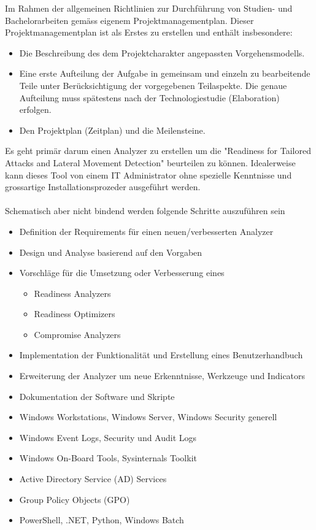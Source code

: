 Im Rahmen der allgemeinen Richtlinien zur Durchführung von Studien- und Bachelorarbeiten gemäss eigenem Projektmanagementplan. Dieser Projektmanagementplan ist als Erstes zu erstellen und enthält insbesondere:
\begin{itemize}
    \item Die Beschreibung des dem Projektcharakter angepassten Vorgehensmodells.
    \item Eine erste Aufteilung der Aufgabe in gemeinsam und einzeln zu bearbeitende Teile unter Berücksichtigung der vorgegebenen Teilaspekte. Die genaue Aufteilung muss spätestens nach der Technologiestudie (Elaboration) erfolgen.
    \item Den Projektplan (Zeitplan) und die Meilensteine.
\end{itemize}

Es geht primär darum einen Analyzer zu erstellen um die "Readiness for Tailored Attacks and Lateral Movement Detection" beurteilen zu können. Idealerweise kann dieses Tool von einem IT Administrator ohne spezielle Kenntnisse und grossartige Installationsprozeder ausgeführt werden. 
\\\\
Schematisch aber nicht bindend werden folgende Schritte auszuführen sein
\begin{itemize}
    \item Definition der Requirements für einen neuen/verbesserten Analyzer
    \item Design und Analyse basierend auf den Vorgaben
    \item Vorschläge für die Umsetzung oder Verbesserung eines 
    \begin{itemize}
        \item Readiness Analyzers
        \item Readiness Optimizers
        \item Compromise Analyzers
    \end{itemize}
    \item Implementation der Funktionalität und Erstellung eines Benutzerhandbuch
    \item Erweiterung der Analyzer um neue Erkenntnisse, Werkzeuge und Indicators
    \item Dokumentation der Software und Skripte
\end{itemize}

\begin{itemize}
    \item Windows Workstations, Windows Server, Windows Security generell
    \item Windows Event Logs, Security und Audit Logs
    \item Windows On-Board Tools, Sysinternals Toolkit
    \item Active Directory Service (AD) Services
    \item Group Policy Objects (GPO)
    \item PowerShell, .NET, Python, Windows Batch
\end{itemize}

